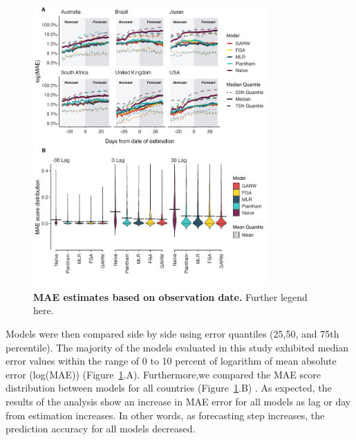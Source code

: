 \documentclass[11pt,oneside,letterpaper]{article}
\begin{document}
\begin{figure}[H]
	\centering
	\includegraphics[width=0.8\textwidth]{figures/Figure2.png}
	\caption{\textbf{MAE estimates based on observation date.}
	Further legend here.
	}
	\label{Figure 2}
\end{figure}


Models were then compared side by side using error quantiles (25,50, and 75th percentile).
The majority of the models evaluated in this study exhibited median error values within the range of 0 to 10 percent of logarithm of mean absolute error (log(MAE)) (Figure~\ref{Figure 2}.A).
Furthermore,we compared the MAE score distribution between models for all countries (Figure~\ref{Figure 2}.B) .
As expected, the results of the analysis show an increase in MAE error for all models as lag or day from estimation increases. 
In other words, as forecasting step increases, the prediction accuracy for all models decreased.
\end{document}
